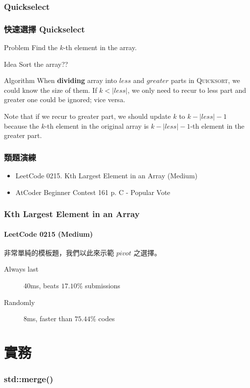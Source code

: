\documentclass{beamer}
\begin{document}
\subsubsection{Quickselect}

\frame
{
	\frametitle{快速選擇 Quickselect}
	
	\begin{block}{Problem}
		Find the $k$-th element in the array.
	\end{block}
	\pause
	
	\begin{block}{Idea}
		Sort the array??
	\end{block}
	\pause
	
	\begin{block}{Algorithm}
		When \textbf{dividing} array into $less$ and $greater$ parts in \textsc{Quicksort}, we could know the size of them. If $k < |less|$, we only need to recur to less part and greater one could be ignored; vice versa.
		
		Note that if we recur to greater part, we should update $k$ to $k - |less| - 1$ because the $k$-th element in the original array is $k - |less| - 1$-th element in the greater part.
	\end{block}
}

\frame
{
	\frametitle{類題演練}
	
	\begin{itemize}
		\item LeetCode 0215. Kth Largest Element in an Array (Medium)
		\item AtCoder Beginner Contest 161 p. C - Popular Vote
	\end{itemize}
}

\frame
{
	\frametitle{Kth Largest Element in an Array}
	\framesubtitle{LeetCode 0215 (Medium)}
	
	非常單純的模板題，我們以此來示範 $pivot$ 之選擇。
	
	\begin{description}
		\item[Always last] 40ms, beats $17.10\%$ submissions
		\item[Randomly] 8ms, faster than $75.44\%$ codes
	\end{description}
}

\section{實務}

\frame
{
	\frametitle{\ttfamily std::merge()}
	
	
}
\end{document}
